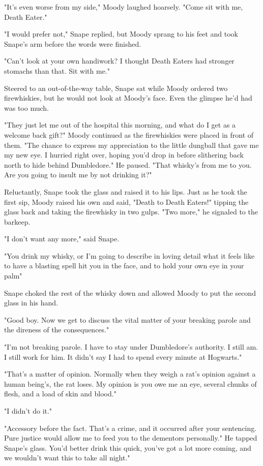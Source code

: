 "It's even worse from my side," Moody laughed hoarsely. "Come sit with me, Death Eater."

"I would prefer not," Snape replied, but Moody sprang to his feet and took Snape's arm before the words were finished.

"Can't look at your own handiwork? I thought Death Eaters had stronger stomachs than that. Sit with me."

Steered to an out-of-the-way table, Snape sat while Moody ordered two firewhiskies, but he would not look at Moody's face. Even the glimpse he'd had was too much.

"They just let me out of the hospital this morning, and what do I get as a welcome back gift?" Moody continued as the firewhiskies were placed in front of them. "The chance to express my appreciation to the little dungball that gave me my new eye. I hurried right over, hoping you'd drop in before slithering back north to hide behind Dumbledore." He paused. "That whisky's from me to you. Are you going to insult me by not drinking it?"

Reluctantly, Snape took the glass and raised it to his lips. Just as he took the first sip, Moody raised his own and said, "Death to Death Eaters!" tipping the glass back and taking the firewhisky in two gulps. "Two more," he signaled to the barkeep.

"I don't want any more," said Snape.

"You drink my whisky, or I'm going to describe in loving detail what it feels like to have a blasting spell hit you in the face, and to hold your own eye in your palm{\el}"

Snape choked the rest of the whisky down and allowed Moody to put the second glass in his hand.

"Good boy. Now we get to discuss the vital matter of your breaking parole and the direness of the consequences."

"I'm not breaking parole. I have to stay under Dumbledore's authority. I still am. I still work for him. It didn't say I had to spend every minute at Hogwarts."

"That's a matter of opinion. Normally when they weigh a rat's opinion against a human being's, the rat loses. My opinion is you owe me an eye, several chunks of flesh, and a load of skin and blood."

"I didn't do it."

"Accessory before the fact. That's a crime, and it occurred after your sentencing. Pure justice would allow me to feed you to the dementors personally." He tapped Snape's glass. You'd better drink this quick, you've got a lot more coming, and we wouldn't want this to take all night."


